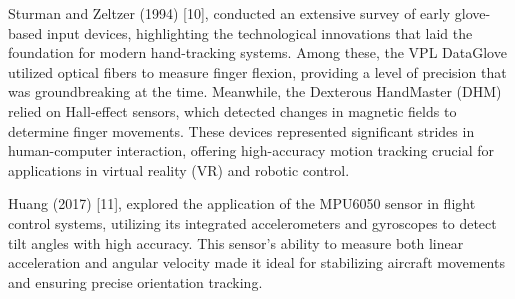 Sturman and Zeltzer (1994) [10],  conducted an extensive survey of early glove-based input devices, highlighting the technological innovations that laid the foundation for modern hand-tracking systems. Among these, the VPL DataGlove utilized optical fibers to measure finger flexion, providing a level of precision that was groundbreaking at the time. Meanwhile, the Dexterous HandMaster (DHM) relied on Hall-effect sensors, which detected changes in magnetic fields to determine finger movements. These devices represented significant strides in human-computer interaction, offering high-accuracy motion tracking crucial for applications in virtual reality (VR) and robotic control.

Huang (2017) [11], explored the application of the MPU6050 sensor in flight control systems, utilizing its integrated accelerometers and gyroscopes to detect tilt angles with high accuracy. This sensor's ability to measure both linear acceleration and angular velocity made it ideal for stabilizing aircraft movements and ensuring precise orientation tracking.

